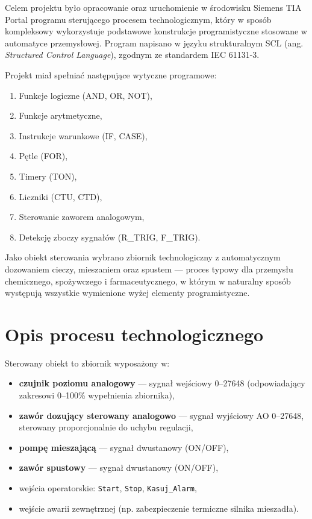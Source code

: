 \documentclass[12pt,a4paper]{report}
\begin{document}
Celem projektu było opracowanie oraz uruchomienie w środowisku Siemens TIA Portal programu sterującego procesem technologicznym, który w sposób kompleksowy wykorzystuje podstawowe konstrukcje programistyczne stosowane w automatyce przemysłowej. Program napisano w języku strukturalnym SCL (ang. \textit{Structured Control Language}), zgodnym ze standardem IEC 61131-3.

Projekt miał spełniać następujące wytyczne programowe:

\begin{enumerate}
    \item Funkcje logiczne (AND, OR, NOT),
    \item Funkcje arytmetyczne,
    \item Instrukcje warunkowe (IF, CASE),
    \item Pętle (FOR),
    \item Timery (TON),
    \item Liczniki (CTU, CTD),
    \item Sterowanie zaworem analogowym,
    \item Detekcję zboczy sygnałów (R\_TRIG, F\_TRIG).
\end{enumerate}

Jako obiekt sterowania wybrano zbiornik technologiczny z automatycznym dozowaniem cieczy, mieszaniem oraz spustem — proces typowy dla przemysłu chemicznego, spożywczego i farmaceutycznego, w którym w naturalny sposób występują wszystkie wymienione wyżej elementy programistyczne.

\chapter{Opis procesu technologicznego}

Sterowany obiekt to zbiornik wyposażony w:

\begin{itemize}
    \item \textbf{czujnik poziomu analogowy} — sygnał wejściowy 0--27648 (odpowiadający zakresowi 0--100\% wypełnienia zbiornika),
    \item \textbf{zawór dozujący sterowany analogowo} — sygnał wyjściowy AO 0--27648, sterowany proporcjonalnie do uchybu regulacji,
    \item \textbf{pompę mieszającą} — sygnał dwustanowy (ON/OFF),
    \item \textbf{zawór spustowy} — sygnał dwustanowy (ON/OFF),
    \item wejścia operatorskie: \texttt{Start}, \texttt{Stop}, \texttt{Kasuj\_Alarm},
    \item wejście awarii zewnętrznej (np. zabezpieczenie termiczne silnika mieszadła).
\end{itemize}
\end{document}
